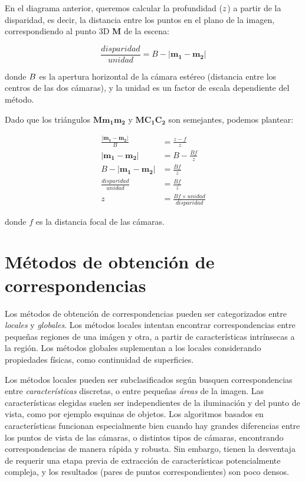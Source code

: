 \documentclass[11pt,a4paper,titlepage]{article}
\newcommand{\Scalar}[1]{\ensuremath{\mathnormal{#1}}}
\newcommand{\Two}[1]{\ensuremath{\mathbf{#1}}}
\newcommand{\Three}[1]{\ensuremath{\mathbf{#1}}}
\begin{document}
En el diagrama anterior, queremos calcular la profundidad (\Scalar{z}) a partir de la disparidad, es decir, la distancia entre los puntos en el plano de la imagen, correspondiendo al punto 3D \Three{M} de la escena:

\[
    \frac{disparidad}{unidad} = B - \left| \Two{m_1} - \Two{m_2} \right|
\]

donde \Scalar{B} es la apertura horizontal de la cámara estéreo (distancia entre los centros de las dos cámaras), y la unidad es un factor de escala dependiente del método.

Dado que los triángulos $\Three{M}\Two{m_1}\Two{m_2}$ y $\Three{M}\Three{C_1}\Three{C_2}$ son semejantes, podemos plantear:

\begin{align*}
    \frac{\left| \Two{m_1} - \Two{m_2} \right|}{B} & = \frac{z - f}{z} \\
    \left| \Two{m_1} - \Two{m_2} \right| & = B - \frac{Bf}{z} \\
    B - \left| \Two{m_1} - \Two{m_2} \right| & = \frac{Bf}{z} \\
    \frac{disparidad}{unidad} & = \frac{Bf}{z} \\
    z & = \frac{Bf \times unidad}{disparidad}
\end{align*}

donde $f$ es la distancia focal de las cámaras.

\newpage

\section{Métodos de obtención de correspondencias}

Los métodos de obtención de correspondencias pueden ser categorizados entre \textit{locales} y \textit{globales}. Los métodos locales intentan encontrar correspondencias entre pequeñas regiones de una imágen y otra, a partir de características intrínsecas a la región. Los métodos globales suplementan a los locales considerando propiedades físicas, como continuidad de superficies.

Los métodos locales pueden ser subclasificados según busquen correspondencias entre \textit{características} discretas, o entre pequeñas \textit{áreas} de la imagen. Las características elegidas suelen ser independientes de la iluminación y del punto de vista, como por ejemplo esquinas de objetos. Los algoritmos basados en características funcionan especialmente bien cuando hay grandes diferencias entre los puntos de vista de las cámaras, o distintos tipos de cámaras, encontrando correspondencias de manera rápida y robusta. Sin embargo, tienen la desventaja de requerir una etapa previa de extracción de características potencialmente compleja, y los resultados (pares de puntos correspondientes) son poco densos.
\end{document}
